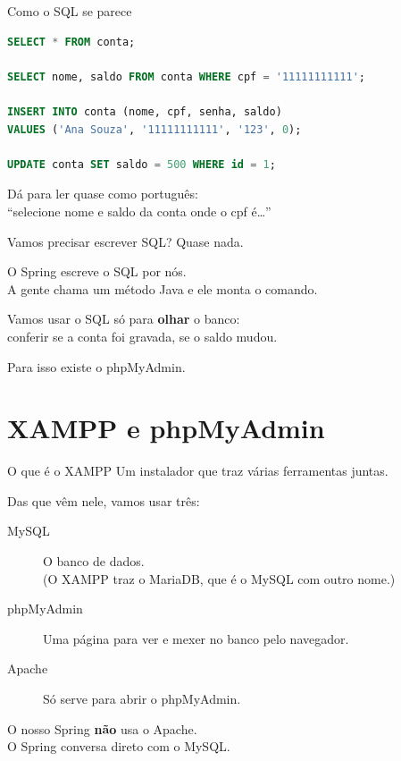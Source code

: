 \documentclass[aspectratio=169,11pt]{beamer}
\begin{document}
\begin{frame}[fragile]{Como o SQL se parece}
\begin{lstlisting}[language=SQL,basicstyle=\ttfamily\footnotesize]
SELECT * FROM conta;

SELECT nome, saldo FROM conta WHERE cpf = '11111111111';

INSERT INTO conta (nome, cpf, senha, saldo)
VALUES ('Ana Souza', '11111111111', '123', 0);

UPDATE conta SET saldo = 500 WHERE id = 1;
\end{lstlisting}

  \vspace{0.3em}
  Dá para ler quase como português:\\
  ``selecione nome e saldo da conta onde o cpf é\ldots''
\end{frame}

\begin{frame}{Vamos precisar escrever SQL?}
  Quase nada.

  \vspace{0.6em}
  O Spring escreve o SQL por nós.\\
  A gente chama um método Java e ele monta o comando.

  \vspace{0.6em}
  Vamos usar o SQL só para \textbf{olhar} o banco:\\
  conferir se a conta foi gravada, se o saldo mudou.

  \vspace{0.6em}
  Para isso existe o phpMyAdmin.
\end{frame}

\section{XAMPP e phpMyAdmin}

\begin{frame}{O que é o XAMPP}
  Um instalador que traz várias ferramentas juntas.

  \vspace{0.5em}
  Das que vêm nele, vamos usar três:

  \vspace{0.4em}
  \begin{description}
    \item[MySQL] O banco de dados.\\
      {\small (O XAMPP traz o MariaDB, que é o MySQL com outro nome.)}
    \item[phpMyAdmin] Uma página para ver e mexer no banco pelo navegador.
    \item[Apache] Só serve para abrir o phpMyAdmin.
  \end{description}

  \vspace{0.5em}
  O nosso Spring \textbf{não} usa o Apache.\\
  O Spring conversa direto com o MySQL.
\end{frame}
\end{document}
